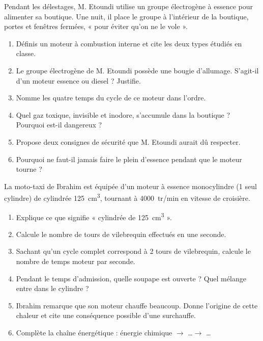 \documentclass[11pt]{article}
\begin{document}
\begin{exercice}
Pendant les délestages, M. Etoundi utilise un groupe électrogène à essence pour alimenter sa boutique. Une nuit, il place le groupe à l'intérieur de la boutique, portes et fenêtres fermées, « pour éviter qu'on ne le vole ».
\begin{enumerate}
\item Définis un moteur à combustion interne et cite les deux types étudiés en classe.
\item Le groupe électrogène de M. Etoundi possède une bougie d'allumage. S'agit-il d'un moteur essence ou diesel ? Justifie.
\item Nomme les quatre temps du cycle de ce moteur dans l'ordre.
\item Quel gaz toxique, invisible et inodore, s'accumule dans la boutique ? Pourquoi est-il dangereux ?
\item Propose deux consignes de sécurité que M. Etoundi aurait dû respecter.
\item Pourquoi ne faut-il jamais faire le plein d'essence pendant que le moteur tourne ?
\end{enumerate}
\end{exercice}

\begin{exercice}
La moto-taxi de Ibrahim est équipée d'un moteur à essence monocylindre (1 seul cylindre) de cylindrée \SI{125}{cm^3}, tournant à \SI{4000}{tr/min} en vitesse de croisière.
\begin{enumerate}
\item Explique ce que signifie « cylindrée de \SI{125}{cm^3} ».
\item Calcule le nombre de tours de vilebrequin effectués en une seconde.
\item Sachant qu'un cycle complet correspond à 2 tours de vilebrequin, calcule le nombre de temps moteur par seconde.
\item Pendant le temps d'admission, quelle soupape est ouverte ? Quel mélange entre dans le cylindre ?
\item Ibrahim remarque que son moteur chauffe beaucoup. Donne l'origine de cette chaleur et cite une conséquence possible d'une surchauffe.
\item Complète la chaîne énergétique : énergie chimique $\rightarrow$ \ldots $\rightarrow$ \ldots
\end{enumerate}
\end{exercice}
\end{document}
